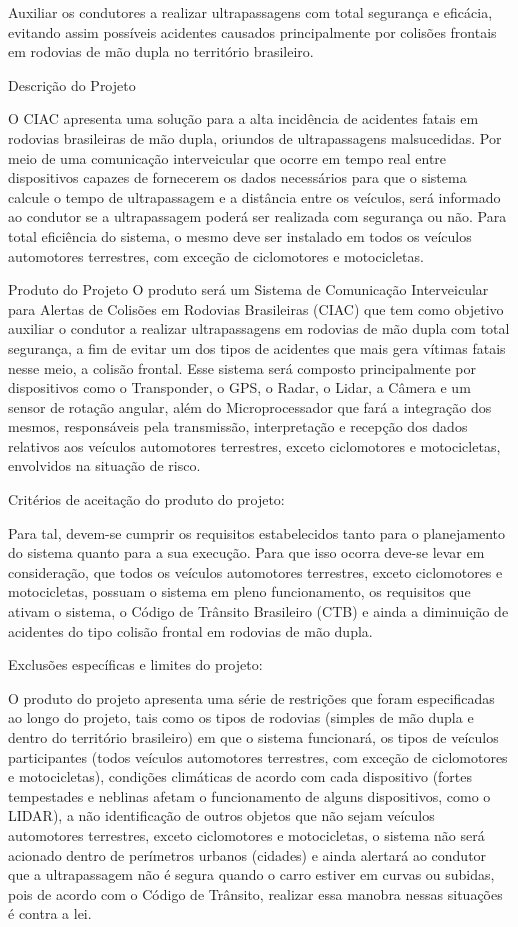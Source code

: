 Auxiliar os condutores a realizar ultrapassagens com total segurança e eficácia, evitando assim possíveis acidentes causados principalmente por colisões frontais em rodovias de mão dupla no território brasileiro.

Descrição do Projeto

O CIAC apresenta uma solução para a alta incidência de acidentes fatais em rodovias brasileiras de mão dupla, oriundos de ultrapassagens malsucedidas. Por meio de uma comunicação interveicular que ocorre em tempo real entre dispositivos capazes de fornecerem os dados necessários para que o sistema calcule o tempo de ultrapassagem e a distância entre os veículos, será informado ao condutor se a ultrapassagem poderá ser realizada com segurança ou não. Para total eficiência do sistema, o mesmo deve ser instalado em todos os veículos automotores terrestres, com exceção de ciclomotores e motocicletas.

Produto do Projeto
O produto será um Sistema de Comunicação Interveicular para Alertas de Colisões em Rodovias Brasileiras (CIAC) que tem como objetivo auxiliar o condutor a realizar ultrapassagens em rodovias de mão dupla com total segurança, a fim de evitar um dos tipos de acidentes que mais gera vítimas fatais nesse meio, a colisão frontal. Esse sistema será composto principalmente por dispositivos como o Transponder, o GPS, o Radar, o Lidar, a Câmera e um sensor de rotação angular, além do Microprocessador que fará a integração dos mesmos, responsáveis pela transmissão, interpretação e recepção dos dados relativos aos veículos automotores terrestres, exceto ciclomotores e motocicletas, envolvidos na situação de risco.




Critérios de aceitação do produto do projeto:

Para tal, devem-se cumprir os requisitos estabelecidos tanto para o planejamento do sistema quanto para a sua execução. Para que isso ocorra deve-se levar em consideração, que todos os veículos automotores terrestres, exceto ciclomotores e motocicletas, possuam o sistema em pleno funcionamento, os requisitos que ativam o sistema, o Código de Trânsito Brasileiro (CTB) e ainda a diminuição de acidentes do tipo colisão frontal em rodovias de mão dupla.

Exclusões específicas e limites do projeto:

O produto do projeto apresenta uma série de restrições que foram especificadas ao longo do projeto, tais como os tipos de rodovias (simples de mão dupla e dentro do território brasileiro) em que o sistema funcionará, os tipos de veículos participantes (todos veículos automotores terrestres, com exceção de ciclomotores e motocicletas), condições climáticas de acordo com cada dispositivo (fortes tempestades e neblinas afetam o funcionamento de alguns dispositivos, como o LIDAR), a não identificação de outros objetos que não sejam veículos automotores terrestres, exceto ciclomotores e motocicletas, o sistema não será acionado dentro de perímetros urbanos (cidades) e ainda alertará ao condutor que a ultrapassagem não é segura quando o carro estiver em curvas ou subidas, pois de acordo com o Código de Trânsito, realizar essa manobra nessas situações é contra a lei.

